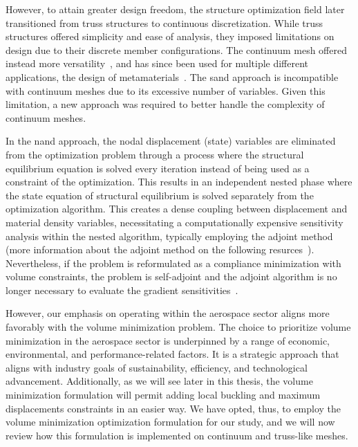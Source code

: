 However, to attain greater design freedom, the structure optimization field later transitioned from truss structures to continuous discretization. While truss structures offered simplicity and ease of analysis, they imposed limitations on design due to their discrete member configurations. The continuum mesh offered instead more versatility~, and has since been used for multiple different applications, \eg the design of metamaterials~. The \gls{sand} approach is incompatible with continuum meshes due to its excessive number of variables. Given this limitation, a new approach was required to better handle the complexity of continuum meshes.

In the \acrfull{nand} approach, the nodal displacement (state) variables are eliminated from the optimization problem through a process where the structural equilibrium equation is solved every iteration instead of being used as a constraint of the optimization. This results in an independent nested phase where the state equation of structural equilibrium is solved separately from the optimization algorithm. This creates a dense coupling between displacement and material density variables, necessitating a computationally expensive sensitivity analysis within the nested algorithm, typically employing the adjoint method (more information about the adjoint method on the following resurces~). Nevertheless, if the problem is reformulated as a compliance minimization with volume constraints, the problem is self-adjoint and the adjoint algorithm is no longer necessary to evaluate the gradient sensitivities~.

However, our emphasis on operating within the aerospace sector aligns more favorably with the volume minimization problem. The choice to prioritize volume minimization in the aerospace sector is underpinned by a range of economic, environmental, and performance-related factors. It is a strategic approach that aligns with industry goals of sustainability, efficiency, and technological advancement. Additionally, as we will see later in this thesis, the volume minimization formulation will permit adding local buckling and maximum displacements constraints in an easier way. We have opted, thus, to employ the volume minimization optimization formulation for our study, and we will now review how this formulation is implemented on continuum and truss-like meshes.

